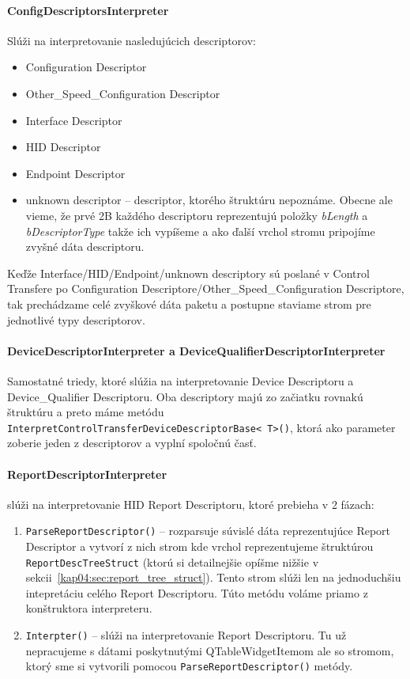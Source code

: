 \paragraph{ConfigDescriptorsInterpreter}
\hfill \break
Slúži na interpretovanie nasledujúcich descriptorov:
\begin{itemize}
\item Configuration Descriptor
\item Other\_Speed\_Configuration Descriptor
\item Interface Descriptor
\item HID Descriptor
\item Endpoint Descriptor
\item unknown descriptor -- descriptor, ktorého štruktúru nepoznáme. Obecne ale vieme, že prvé 2B každého descriptoru reprezentujú položky \textit{bLength} a \textit{bDescriptorType} takže ich vypíšeme a ako ďalší vrchol stromu pripojíme zvyšné dáta descriptoru.
\end{itemize}
Keďže Interface/HID/Endpoint/unknown descriptory sú poslané v Control Transfere po Configuration Descriptore/Other\_Speed\_Configuration Descriptore, tak prechádzame celé zvyškové dáta paketu a postupne staviame strom pre jednotlivé typy descriptorov.

\paragraph{DeviceDescriptorInterpreter a DeviceQualifierDescriptorInterpreter}
\hfill \break
Samostatné triedy, ktoré slúžia na interpretovanie Device Descriptoru a Device\_Qualifier Descriptoru. Oba descriptory majú zo začiatku rovnakú štruktúru a preto máme metódu \texttt{InterpretControlTransferDeviceDescriptorBase\textless~T\textgreater()}, ktorá ako parameter zoberie jeden z descriptorov a vyplní spoločnú časť.

\paragraph{ReportDescriptorInterpreter} slúži na interpretovanie HID Report Descriptoru, ktoré prebieha v 2 fázach:
\begin{enumerate}
\item \texttt{ParseReportDescriptor()} -- rozparsuje súvislé dáta reprezentujúce Report Descriptor a vytvorí z nich strom kde vrchol reprezentujeme štruktúrou \texttt{ReportDescTreeStruct} (ktorú si detailnejšie opíšme nižšie v sekcii~\ref{kap04:sec:report_tree_struct}). Tento strom slúži len na jednoduchšiu intepretáciu celého Report Descriptoru. Túto metódu voláme priamo z konštruktora interpreteru.
\item \texttt{Interpter()} -- slúži na interpretovanie Report Descriptoru. Tu už nepracujeme s dátami poskytnutými QTableWidgetItemom ale so stromom, ktorý sme si vytvorili pomocou \texttt{ParseReportDescriptor()} metódy.
\end{enumerate}

